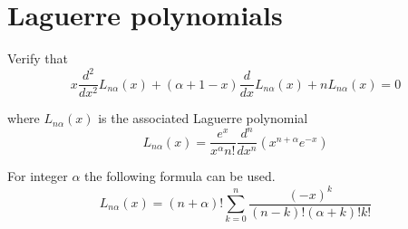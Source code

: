 

\section*{Laguerre polynomials}

Verify that
\begin{equation*}
x\frac{d^2}{dx^2}L_{n\alpha}(x)+(\alpha+1-x)\frac{d}{dx}L_{n\alpha}(x)+nL_{n\alpha}(x)=0
\tag{1}
\end{equation*}

where $L_{n\alpha}(x)$ is the associated Laguerre polynomial
\begin{equation*}
L_{n\alpha}(x)=\frac{e^x}{x^\alpha n!}\frac{d^n}{dx^n}(x^{n+\alpha}e^{-x})
\end{equation*}

For integer $\alpha$ the following formula can be used.
\begin{equation*}
L_{n\alpha}(x)=(n+\alpha)!\sum_{k=0}^n\frac{(-x)^k}{(n-k)!(\alpha+k)!k!}
\end{equation*}


